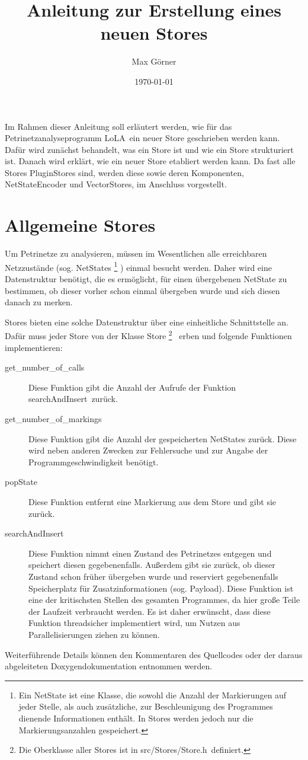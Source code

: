 \documentclass[12pt,a4paper,titlepage]{scrartcl}
\title{Anleitung zur Erstellung eines neuen Stores}
\author{Max Görner}
\date{\today}
\renewcommand \( {\left (}
\renewcommand \) {\right )}
\renewcommand \[ {\left [}
\renewcommand \] {\right ]}
\newcommand \Flqq {\flqq\ }
\newcommand{\lola}{\frqq LoLA\Flqq}
\begin{document}
\maketitle
Im Rahmen dieser Anleitung soll erläutert werden, wie für das Petrinetzanalyseprogramm \lola ein neuer Store geschrieben werden kann. Dafür wird zunächst behandelt, was ein Store ist und wie ein Store strukturiert ist. Danach wird erklärt, wie ein neuer Store etabliert werden kann. Da fast alle Stores PluginStores sind, werden diese sowie deren Komponenten, NetStateEncoder und VectorStores, im Anschluss vorgestellt.

\section{Allgemeine Stores}
\label{kap:algStores}
Um Petrinetze zu analysieren, müssen im Wesentlichen alle erreichbaren Netzzustände (sog. NetStates
\footnote{Ein NetState ist eine Klasse, die sowohl die Anzahl der Markierungen auf jeder Stelle, als auch zusätzliche, zur Beschleunigung des Programmes dienende Informationen enthält. In Stores werden jedoch nur die Markierungsanzahlen gespeichert.}
) einmal besucht werden. Daher wird eine Datenstruktur benötigt, die es ermöglicht, für einen übergebenen NetState zu bestimmen, ob dieser vorher schon einmal übergeben wurde und sich diesen danach zu merken.

Stores bieten eine solche Datenstruktur über eine einheitliche Schnittstelle an. Dafür muss jeder Store von der Klasse \frqq Store
\footnote{Die Oberklasse aller Stores ist in \frqq src/Stores/Store.h\Flqq definiert.}
\Flqq erben und folgende Funktionen implementieren:
\begin{description}
\item[get\_number\_of\_calls] Diese Funktion gibt die Anzahl der Aufrufe der Funktion \frqq searchAndInsert\Flqq zurück.
\item[get\_number\_of\_markings] Diese Funktion gibt die Anzahl der gespeicherten NetStates zurück. Diese wird neben anderen Zwecken zur Fehlersuche und zur Angabe der Programmgeschwindigkeit benötigt.
\item[popState] Diese Funktion entfernt eine Markierung aus dem Store und gibt sie zurück.
\item[searchAndInsert] Diese Funktion nimmt einen Zustand des Petrinetzes entgegen und speichert diesen gegebenenfalls. Außerdem gibt sie zurück, ob dieser Zustand schon früher übergeben wurde und reserviert gegebenenfalls Speicherplatz für Zusatzinformationen (sog. Payload). Diese Funktion ist eine der kritischsten Stellen des gesamten Programmes, da hier große Teile der Laufzeit verbraucht werden. Es ist daher erwünscht, dass diese Funktion threadsicher implementiert wird, um Nutzen aus Parallelisierungen ziehen zu können.
\end{description}
Weiterführende Details können den Kommentaren des Quellcodes oder der daraus abgeleiteten Doxygendokumentation entnommen werden.
\end{document}
